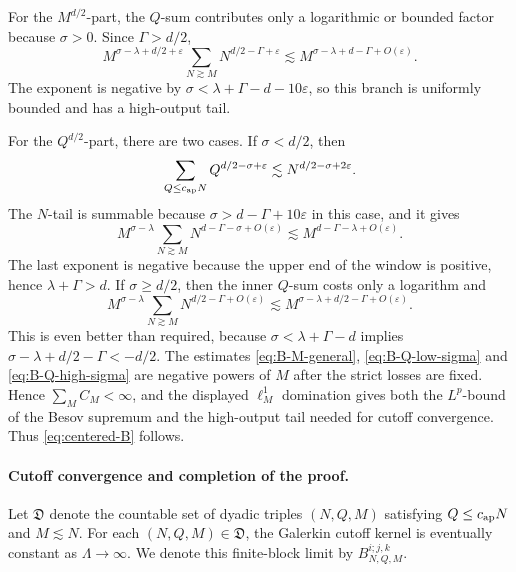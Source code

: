 \documentclass[11pt,reqno]{amsart}
\numberwithin{equation}{section}
\theoremstyle{plain}
\theoremstyle{definition}
\newcommand{\eps}{\varepsilon}
\begin{document}
For the \(M^{d/2}\)-part, the \(Q\)-sum contributes only a logarithmic or bounded factor because \(\sigma>0\).  Since \(\Gamma>d/2\),
\begin{equation}\label{eq:B-M-general}
        M^{\sigma-\lambda+d/2+\eps}
        \sum_{N\gtrsim M}N^{d/2-\Gamma+\eps}
        \lesssim
        M^{\sigma-\lambda+d-\Gamma+O(\eps)}.
\end{equation}
The exponent is negative by \(\sigma<\lambda+\Gamma-d-10\eps\), so this branch is uniformly bounded and has a high-output tail.

For the \(Q^{d/2}\)-part, there are two cases.  If \(\sigma<d/2\), then
\[
        \sum_{Q\le c_{\rm ap}N}Q^{d/2-\sigma+\eps}
        \lesssim N^{d/2-\sigma+2\eps}.
\]
The \(N\)-tail is summable because \(\sigma>d-\Gamma+10\eps\) in this case, and it gives
\begin{equation}\label{eq:B-Q-low-sigma}
        M^{\sigma-\lambda}
        \sum_{N\gtrsim M}N^{d-\Gamma-\sigma+O(\eps)}
        \lesssim
        M^{d-\Gamma-\lambda+O(\eps)}.
\end{equation}
The last exponent is negative because the upper end of the window is positive, hence \(\lambda+\Gamma>d\).  If \(\sigma\ge d/2\), then the inner \(Q\)-sum costs only a logarithm and
\begin{equation}\label{eq:B-Q-high-sigma}
        M^{\sigma-\lambda}
        \sum_{N\gtrsim M}N^{d/2-\Gamma+O(\eps)}
        \lesssim
        M^{\sigma-\lambda+d/2-\Gamma+O(\eps)}.
\end{equation}
This is even better than required, because \(\sigma<\lambda+\Gamma-d\) implies
\(
        \sigma-\lambda+d/2-\Gamma<-d/2.
\)
The estimates \eqref{eq:B-M-general}, \eqref{eq:B-Q-low-sigma} and \eqref{eq:B-Q-high-sigma} are negative powers of \(M\) after the strict losses are fixed.  Hence \(\sum_M C_M<\infty\), and the displayed \(\ell^1_M\) domination gives both the \(L^p\)-bound of the Besov supremum and the high-output tail needed for cutoff convergence.  Thus \eqref{eq:centered-B} follows.



\paragraph{Cutoff convergence and completion of the proof.}
Let \(\mathfrak D\) denote the countable set of dyadic triples \((N,Q,M)\) satisfying \(Q\le c_{\rm ap}N\) and \(M\lesssim N\).  For each \((N,Q,M)\in\mathfrak D\), the Galerkin cutoff kernel is eventually constant as \(\Lambda\to\infty\).  We denote this finite-block limit by \(B_{N,Q,M}^{i;j,k}\).
\end{document}
